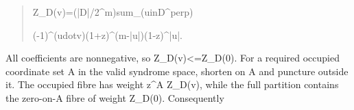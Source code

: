\documentclass[
]{article}
\begin{document}
\begin{quote}\small\ttfamily\raggedright\setlength{\parskip}{0pt}
\noindent Z\allowbreak{}\_\allowbreak{}D\allowbreak{}(\allowbreak{}v\allowbreak{})\allowbreak{}=\allowbreak{}(\allowbreak{}|\allowbreak{}D\allowbreak{}|\allowbreak{}/\allowbreak{}2\allowbreak{}\^{}\allowbreak{}m\allowbreak{})\allowbreak{}\hspace*{0.525em}\allowbreak{}s\allowbreak{}u\allowbreak{}m\allowbreak{}\_\allowbreak{}(\allowbreak{}u\allowbreak{}\hspace*{0.525em}\allowbreak{}i\allowbreak{}n\allowbreak{}\hspace*{0.525em}\allowbreak{}D\allowbreak{}\^{}\allowbreak{}p\allowbreak{}e\allowbreak{}r\allowbreak{}p\allowbreak{})\par
\noindent \hspace*{0.525em}\allowbreak{}\hspace*{0.525em}\allowbreak{}\hspace*{0.525em}\allowbreak{}\hspace*{0.525em}\allowbreak{}\hspace*{0.525em}\allowbreak{}\hspace*{0.525em}\allowbreak{}\hspace*{0.525em}\allowbreak{}\hspace*{0.525em}\allowbreak{}\hspace*{0.525em}\allowbreak{}\hspace*{0.525em}\allowbreak{}(\allowbreak{}-\allowbreak{}1\allowbreak{})\allowbreak{}\^{}\allowbreak{}(\allowbreak{}u\allowbreak{}\hspace*{0.525em}\allowbreak{}d\allowbreak{}o\allowbreak{}t\allowbreak{}\hspace*{0.525em}\allowbreak{}v\allowbreak{})\allowbreak{}(\allowbreak{}1\allowbreak{}+\allowbreak{}z\allowbreak{})\allowbreak{}\^{}\allowbreak{}(\allowbreak{}m\allowbreak{}-\allowbreak{}|\allowbreak{}u\allowbreak{}|\allowbreak{})\allowbreak{}(\allowbreak{}1\allowbreak{}-\allowbreak{}z\allowbreak{})\allowbreak{}\^{}\allowbreak{}|\allowbreak{}u\allowbreak{}|\allowbreak{}.\par
\end{quote}

All coefficients are nonnegative, so
Z\allowbreak{}\_\allowbreak{}D\allowbreak{}(\allowbreak{}v\allowbreak{})\allowbreak{}<\allowbreak{}=\allowbreak{}Z\allowbreak{}\_\allowbreak{}D\allowbreak{}(\allowbreak{}0\allowbreak{})\allowbreak{}.
For a required occupied coordinate set A in the valid syndrome space,
shorten on A and puncture outside it. The occupied fibre has weight
z\^{}\textbar A\textbar{} Z\_D(v), while the full partition contains the
zero-on-A fibre of weight Z\_D(0). Consequently
\end{document}
